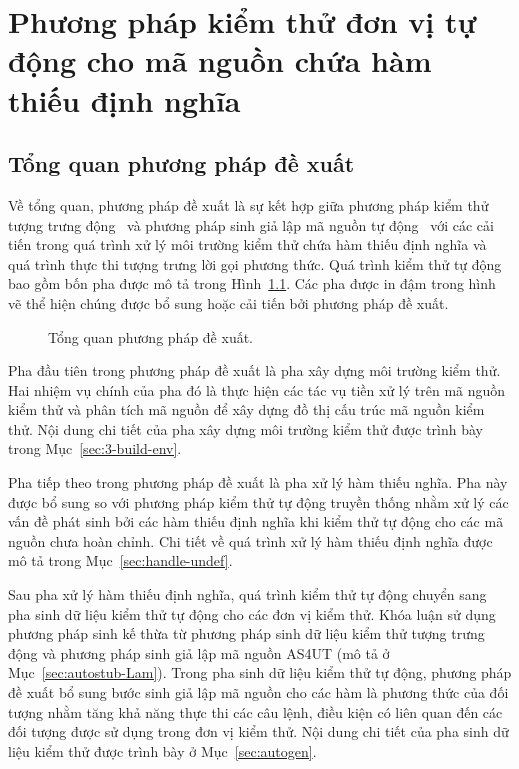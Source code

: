 \chapter{Phương pháp kiểm thử đơn vị tự động cho mã nguồn chứa hàm thiếu định nghĩa}
\section{Tổng quan phương pháp đề xuất}\label{sec:tongquan}
Về tổng quan, phương pháp đề xuất là sự kết hợp giữa phương pháp kiểm thử tượng trưng động~\cite{ConcolicTesting} và phương pháp sinh giả lập mã nguồn tự động~\cite{TUNG2022106821} với các cải tiến trong quá trình xử lý môi trường kiểm thử chứa hàm thiếu định nghĩa và quá trình thực thi tượng trưng lời gọi phương thức. Quá trình kiểm thử tự động bao gồm bốn pha được mô tả trong Hình~\ref{fig:proposed-flow}. Các pha được in đậm trong hình vẽ thể hiện chúng được bổ sung hoặc cải tiến bởi phương pháp đề xuất.

\begin{figure}[h]
    \centering
    
    \caption{Tổng quan phương pháp đề xuất.}
    \label{fig:proposed-flow}
\end{figure}

Pha đầu tiên trong phương pháp đề xuất là pha xây dựng môi trường kiểm thử. Hai nhiệm vụ chính của pha đó là thực hiện các tác vụ tiền xử lý trên mã nguồn kiểm thử và phân tích mã nguồn để xây dựng đồ thị cấu trúc mã nguồn kiểm thử. Nội dung chi tiết của pha xây dựng môi trường kiểm thử được trình bày trong Mục~\ref{sec:3-build-env}.

Pha tiếp theo trong phương pháp đề xuất là pha xử lý hàm thiếu nghĩa. Pha này được bổ sung so với phương pháp kiểm thử tự động truyền thống nhằm xử lý các vấn đề phát sinh bởi các hàm thiếu định nghĩa khi kiểm thử tự động cho các mã nguồn chưa hoàn chỉnh. Chi tiết về quá trình xử lý hàm thiếu định nghĩa được mô tả trong Mục~\ref{sec:handle-undef}.

Sau pha xử lý hàm thiếu định nghĩa, quá trình kiểm thử tự động chuyển sang pha sinh dữ liệu kiểm thử tự động cho các đơn vị kiểm thử. Khóa luận sử dụng phương pháp sinh kế thừa từ phương pháp sinh dữ liệu kiểm thử tượng trưng động và phương pháp sinh giả lập mã nguồn AS4UT (mô tả ở Mục~\ref{sec:autostub-Lam}). Trong pha sinh dữ liệu kiểm thử tự động, phương pháp đề xuất bổ sung bước sinh giả lập mã nguồn cho các hàm là phương thức của đối tượng nhằm tăng khả năng thực thi các câu lệnh, điều kiện có liên quan đến các đối tượng được sử dụng trong đơn vị kiểm thử. Nội dung chi tiết của pha sinh dữ liệu kiểm thử được trình bày ở Mục~\ref{sec:autogen}. 

